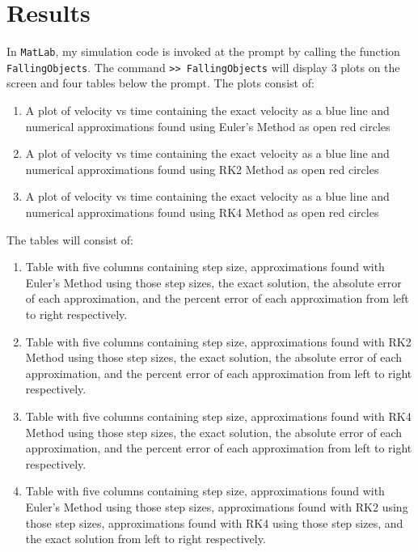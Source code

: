 \documentclass[12pt]{article}
\begin{document}
\section{Results}\label{sec::results}
In \texttt{MatLab}, my simulation code is invoked at the prompt by calling the function \texttt{FallingObjects}. The command
\newline\newline
\texttt{>> FallingObjects}
\newline\newline
will display 3 plots on the screen and four tables below the prompt. The plots consist of:
\begin{enumerate}
\item A plot of velocity vs time containing the exact velocity as a blue line and numerical approximations found using Euler's Method as open red circles
\item A plot of velocity vs time containing the exact velocity as a blue line and numerical approximations found using RK2 Method as open red circles
\item A plot of velocity vs time containing the exact velocity as a blue line and numerical approximations found using RK4 Method as open red circles
\end{enumerate}
The tables will consist of:
\begin{enumerate}
\item Table with five columns containing step size, approximations found with Euler's Method using those step sizes, the exact solution, the absolute error of each approximation, and the percent error of each approximation from left to right respectively.
\item Table with five columns containing step size, approximations found with RK2 Method using those step sizes, the exact solution, the absolute error of each approximation, and the percent error of each approximation from left to right respectively.
\item Table with five columns containing step size, approximations found with RK4 Method using those step sizes, the exact solution, the absolute error of each approximation, and the percent error of each approximation from left to right respectively.
\item Table with five columns containing step size, approximations found with Euler's Method using those step sizes, approximations found with RK2 using those step sizes, approximations found with RK4 using those step sizes, and the exact solution from left to right respectively.
\end{enumerate}
\end{document}
